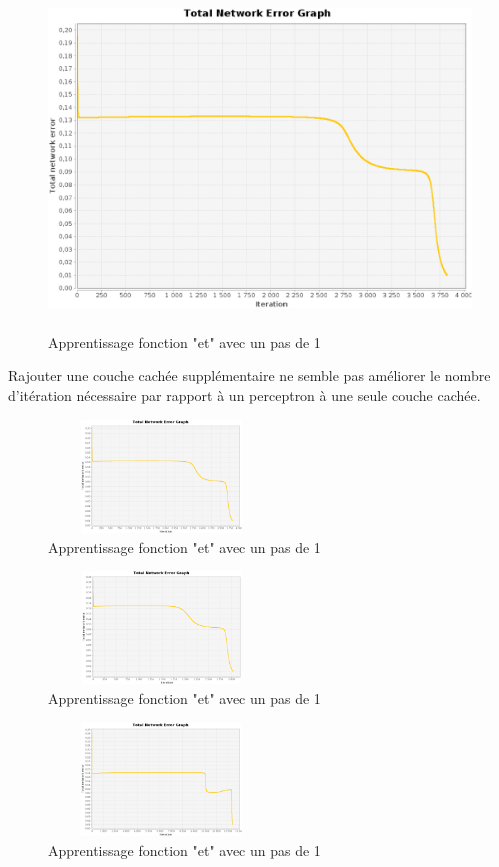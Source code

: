 \documentclass[twoside,openright,a4paper,11pt,french]{article}
\begin{document}
\begin{figure}[ht]
\centering
\includegraphics[width=12cm,height=9cm]{./pics/eq/multi_3_3_def.eps}
\caption{Apprentissage fonction "et" avec un pas de 1}
\end{figure}


Rajouter une couche cachée supplémentaire ne semble pas améliorer le nombre d'itération
nécessaire par rapport à un perceptron à une seule couche cachée.

\begin{figure}[ht]
\centering
\includegraphics[width=6cm,height=3cm]{./pics/eq/multi_3_3_def.eps}
\caption{Apprentissage fonction "et" avec un pas de 1}
\end{figure}

\begin{figure}[ht]
\centering
\includegraphics[width=6cm,height=3cm]{./pics/eq/multi_4_4_def.eps}
\caption{Apprentissage fonction "et" avec un pas de 1}
\end{figure}

\begin{figure}[ht]
\centering
\includegraphics[width=6cm,height=3cm]{./pics/eq/multi_6_6_def.eps}
\caption{Apprentissage fonction "et" avec un pas de 1}
\end{figure}
\end{document}

